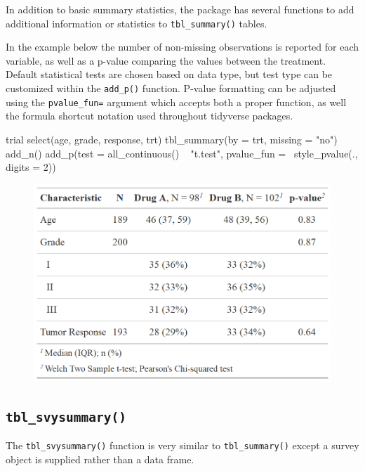 In addition to basic summary statistics, the  package has several functions to add additional information or statistics to \texttt{tbl\_summary()} tables.



In the example below the number of non-missing observations is reported for each variable, as well as a p-value comparing the values between the treatment. Default statistical tests are chosen based on data type, but test type can be customized within the \texttt{add\_p()} function. P-value formatting can be adjusted using the \texttt{pvalue\_fun=} argument which accepts both a proper function, as well the formula shortcut notation used throughout tidyverse packages.

\begin{example}
trial %
  select(age, grade, response, trt) %
  tbl_summary(by = trt, missing = "no") %
  add_n() %
  add_p(test = all_continuous() ~ "t.test",
        pvalue_fun = ~style_pvalue(., digits = 2))

\end{example}
\begin{figure}[h!]
  \includegraphics[scale=0.28]{summary_plus_plus.png}
  \centering
\end{figure}

\subsection{\texorpdfstring{\texttt{tbl\_svysummary()}}{tbl\_svysummary()}}

The \texttt{tbl\_svysummary()} function is very similar to \texttt{tbl\_summary()} except a survey object is supplied rather than a data frame.

